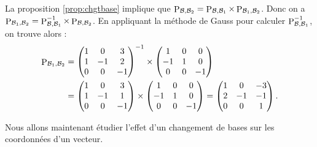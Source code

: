 \documentclass[class=report,crop=false]{standalone}
\begin{document}
\begin{exemple}
La proposition \ref{prop:chgtbase} implique que
$\mathop{\mathrm{P}}\nolimits_{\mathcal{B}, \mathcal{B}_2} = \mathop{\mathrm{P}}\nolimits_{\mathcal{B}, \mathcal{B}_1} \times \mathop{\mathrm{P}}\nolimits_{\mathcal{B}_1, \mathcal{B}_2}$.
Donc on a
$\mathop{\mathrm{P}}\nolimits_{\mathcal{B}_1, \mathcal{B}_2} =  \mathop{\mathrm{P}}\nolimits_{\mathcal{B}, \mathcal{B}_1}^{-1} \times \mathop{\mathrm{P}}\nolimits_{\mathcal{B}, \mathcal{B}_2}$.
En appliquant la méthode de Gauss pour calculer $\mathop{\mathrm{P}}\nolimits_{\mathcal{B}, \mathcal{B}_1}^{-1}$,
on trouve alors :
\begin{align*}
\mathop{\mathrm{P}}\nolimits_{\mathcal{B}_1, \mathcal{B}_2} &=
\begin{pmatrix}
1 & 0 & 3\\
1 & -1 & 2\\
0 & 0 &-1
\end{pmatrix}^{-1}
\times
\begin{pmatrix}
1 & 0 & 0\\
-1 & 1 & 0\\
0 & 0 &-1
\end{pmatrix}\\
&=
\begin{pmatrix}
1 & 0 & 3\\
1 & -1 & 1\\
0 & 0 &-1
\end{pmatrix}
\times
\begin{pmatrix}
1 & 0 & 0\\
-1 & 1 & 0\\
0 & 0 &-1
\end{pmatrix}
= \begin{pmatrix}
1 & 0 & -3\\
2 & -1 & -1\\
0 & 0 & 1
\end{pmatrix}.
\end{align*}
\end{exemple}


\bigskip



Nous allons maintenant étudier l'effet d'un changement de bases sur
les coordonnées d'un vecteur.
\end{document}
